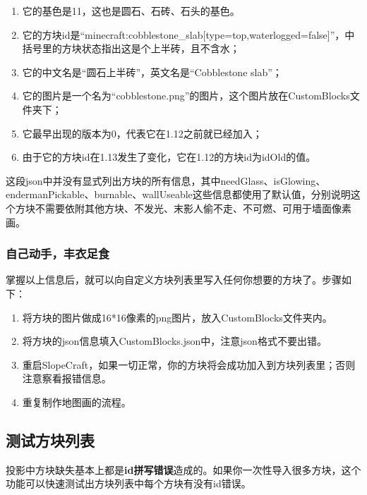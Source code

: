 \documentclass{article}
\begin{document}
    \begin{enumerate}
        \item 它的基色是11，这也是圆石、石砖、石头的基色。
    
        \item 它的方块id是“minecraft:cobblestone\_slab[type=top,waterlogged=false]”，中括号里的方块状态指出这是个上半砖，且不含水；
    
        \item 它的中文名是“圆石上半砖”，英文名是“Cobblestone slab”；
    
        \item 它的图片是一个名为“cobblestone.png”的图片，这个图片放在CustomBlocks文件夹下；
    
        \item 它最早出现的版本为0，代表它在1.12之前就已经加入；
    
        \item 由于它的方块id在1.13发生了变化，它在1.12的方块id为idOld的值。

\end{enumerate}

    这段json中并没有显式列出方块的所有信息，其中needGlass、isGlowing、endermanPickable、burnable、wallUseable这些信息都使用了默认值，分别说明这个方块不需要依附其他方块、不发光、末影人偷不走、不可燃、可用于墙面像素画。

    \subsubsection{自己动手，丰衣足食}
    掌握以上信息后，就可以向自定义方块列表里写入任何你想要的方块了。步骤如下：

    \begin{enumerate}
        \item 将方块的图片做成16*16像素的png图片，放入CustomBlocks文件夹内。
        \item 将方块的json信息填入CustomBlocks.json中，注意json格式不要出错。
        \item 重启SlopeCraft，如果一切正常，你的方块将会成功加入到方块列表里；否则注意察看报错信息。
        \item 重复制作地图画的流程。
    \end{enumerate}

    \subsection{测试方块列表}
    投影中方块缺失基本上都是\textbf{id拼写错误}造成的。如果你一次性导入很多方块，这个功能可以快速测试出方块列表中每个方块有没有id错误。
\end{document}
